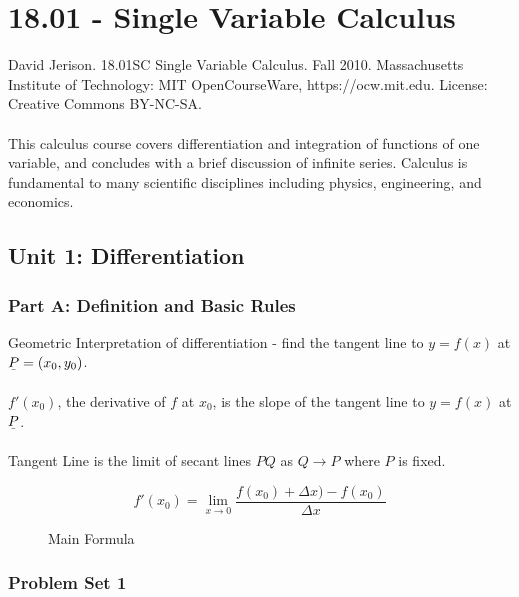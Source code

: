 \section{18.01 - Single Variable Calculus}

\begin{featurebox}
David Jerison. 18.01SC Single Variable Calculus. Fall 2010. Massachusetts Institute of Technology: MIT OpenCourseWare, https://ocw.mit.edu. License: Creative Commons BY-NC-SA.
\\\\
This calculus course covers differentiation and integration of functions of one variable, and concludes with a brief discussion of infinite series. Calculus is fundamental to many scientific disciplines including physics, engineering, and economics.
\end{featurebox}
\newpage

\subsection{Unit 1: Differentiation}




\newpage

\subsubsection{Part A: Definition and Basic Rules}

Geometric Interpretation of differentiation - find the tangent line to $y=f(x)$ at $\underset{\bar{}}{P} = (x_0, y_0)$.

\begin{definition}
$f'(x_0)$, the derivative of $f$ at $x_0$, is the slope of the tangent line to $y = f(x)$ at $\underset{\bar{}}{P}$.
\end{definition}

\begin{definition}Tangent Line is the limit of secant lines $PQ$ as $Q \to P$ where $P$ is fixed.
\end{definition}


\begin{figure}[h]
\caption{Main Formula}
\[f'(x_0) = \lim_{x \to 0}\frac{f(x_0) + \Delta x) - f(x_0)}{\Delta x}\]

\end{figure}

\newpage

\subsubsection{Problem Set 1}

